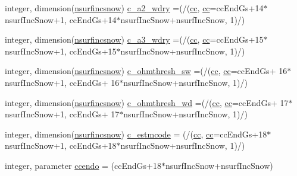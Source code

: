 \begin{DoxyCompactItemize}
\item 
integer, dimension(\hyperlink{namespaceallocatearray_af4d113f332b6759cfa22271140c9162d}{nsurfincsnow}) \hyperlink{namespaceallocatearray_ae537fc0a303aa7ab49bd478a2cdd9798}{c\+\_\+a2\+\_\+wdry} =(/(\hyperlink{namespaceallocatearray_ac863c81704eb507dee10f5e10741e10c}{cc}, \hyperlink{namespaceallocatearray_ac863c81704eb507dee10f5e10741e10c}{cc}=cc\+End\+Gs+14$\ast$nsurf\+Inc\+Snow+1, cc\+End\+Gs+14$\ast$nsurf\+Inc\+Snow+nsurf\+Inc\+Snow, 1)/)
\item 
integer, dimension(\hyperlink{namespaceallocatearray_af4d113f332b6759cfa22271140c9162d}{nsurfincsnow}) \hyperlink{namespaceallocatearray_a8bcd3cee05059ebc666f6d534190375c}{c\+\_\+a3\+\_\+wdry} =(/(\hyperlink{namespaceallocatearray_ac863c81704eb507dee10f5e10741e10c}{cc}, \hyperlink{namespaceallocatearray_ac863c81704eb507dee10f5e10741e10c}{cc}=cc\+End\+Gs+15$\ast$nsurf\+Inc\+Snow+1, cc\+End\+Gs+15$\ast$nsurf\+Inc\+Snow+nsurf\+Inc\+Snow, 1)/)
\item 
integer, dimension(\hyperlink{namespaceallocatearray_af4d113f332b6759cfa22271140c9162d}{nsurfincsnow}) \hyperlink{namespaceallocatearray_a1797c2a2276d91be8028454587aeac96}{c\+\_\+ohmthresh\+\_\+sw} =(/(\hyperlink{namespaceallocatearray_ac863c81704eb507dee10f5e10741e10c}{cc}, \hyperlink{namespaceallocatearray_ac863c81704eb507dee10f5e10741e10c}{cc}=cc\+End\+Gs+ 16$\ast$nsurf\+Inc\+Snow+1, cc\+End\+Gs+ 16$\ast$nsurf\+Inc\+Snow+nsurf\+Inc\+Snow, 1)/)
\item 
integer, dimension(\hyperlink{namespaceallocatearray_af4d113f332b6759cfa22271140c9162d}{nsurfincsnow}) \hyperlink{namespaceallocatearray_a535607f7b8841709da7652a90a12067a}{c\+\_\+ohmthresh\+\_\+wd} =(/(\hyperlink{namespaceallocatearray_ac863c81704eb507dee10f5e10741e10c}{cc}, \hyperlink{namespaceallocatearray_ac863c81704eb507dee10f5e10741e10c}{cc}=cc\+End\+Gs+ 17$\ast$nsurf\+Inc\+Snow+1, cc\+End\+Gs+ 17$\ast$nsurf\+Inc\+Snow+nsurf\+Inc\+Snow, 1)/)
\item 
integer, dimension(\hyperlink{namespaceallocatearray_af4d113f332b6759cfa22271140c9162d}{nsurfincsnow}) \hyperlink{namespaceallocatearray_abae147fda5b19fe8fc0944b217968bf8}{c\+\_\+estmcode} = (/(\hyperlink{namespaceallocatearray_ac863c81704eb507dee10f5e10741e10c}{cc}, \hyperlink{namespaceallocatearray_ac863c81704eb507dee10f5e10741e10c}{cc}=cc\+End\+Gs+18$\ast$nsurf\+Inc\+Snow+1, cc\+End\+Gs+18$\ast$nsurf\+Inc\+Snow+nsurf\+Inc\+Snow, 1)/)
\item 
integer, parameter \hyperlink{namespaceallocatearray_a5faced76ae500e1295bf6364fd110bd1}{ccendo} = (cc\+End\+Gs+18$\ast$nsurf\+Inc\+Snow+nsurf\+Inc\+Snow)

\end{DoxyCompactItemize}
